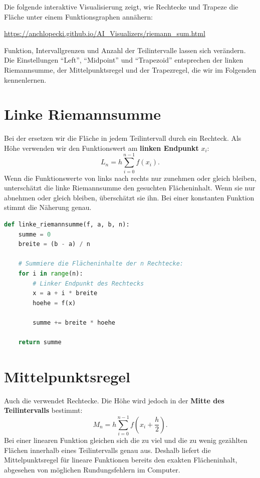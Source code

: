 \begin{myremark}
Die folgende interaktive Visualisierung zeigt, wie Rechtecke und Trapeze die Fläche unter einem Funktionsgraphen annähern:
\begin{center}
    \url{https://anchlopecki.github.io/AI_Visualizers/riemann_sum.html}
\end{center}
Funktion, Intervallgrenzen und Anzahl der Teilintervalle lassen sich verändern. Die Einstellungen \enquote{Left}, \enquote{Midpoint} und \enquote{Trapezoid} entsprechen der linken Riemannsumme, der Mittelpunktsregel und der Trapezregel, die wir im Folgenden kennenlernen.
\end{myremark}

\section{Linke Riemannsumme}

Bei der  ersetzen wir die Fläche in jedem Teilintervall durch ein Rechteck. Als Höhe verwenden wir den Funktionswert am \textbf{linken Endpunkt} $x_i$:
\[
    L_n = h\sum_{i=0}^{n-1} f(x_i).
\]
Wenn die Funktionswerte von links nach rechts nur zunehmen oder gleich bleiben, unterschätzt die linke Riemannsumme den gesuchten Flächeninhalt. Wenn sie nur abnehmen oder gleich bleiben, überschätzt sie ihn. Bei einer konstanten Funktion stimmt die Näherung genau.

\begin{lstlisting}[language=Python, caption={Linke Riemannsumme}, label={lst:quadratur-links}]
def linke_riemannsumme(f, a, b, n):
    summe = 0
    breite = (b - a) / n

    # Summiere die Flächeninhalte der n Rechtecke:
    for i in range(n):
        # Linker Endpunkt des Rechtecks
        x = a + i * breite
        hoehe = f(x)

        summe += breite * hoehe

    return summe
\end{lstlisting}

\section{Mittelpunktsregel}

Auch die  verwendet Rechtecke. Die Höhe wird jedoch in der \textbf{Mitte des Teilintervalls} bestimmt:
\[
    M_n = h\sum_{i=0}^{n-1} f\left(x_i+\frac{h}{2}\right).
\]
Bei einer linearen Funktion gleichen sich die zu viel und die zu wenig gezählten Flächen innerhalb eines Teilintervalls genau aus. Deshalb liefert die Mittelpunktsregel für lineare Funktionen bereits den exakten Flächeninhalt, abgesehen von möglichen Rundungsfehlern im Computer.

